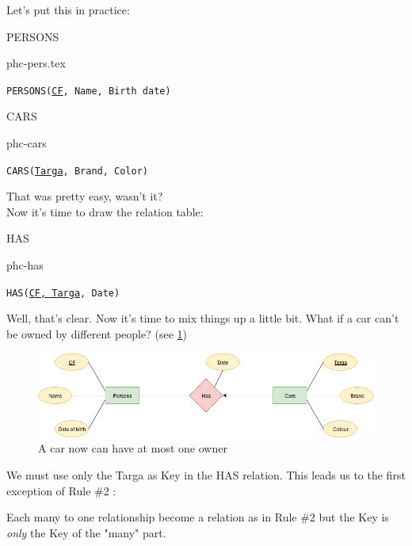 \documentclass[class=book, crop=false, oneside]{standalone}
\begin{document}
Let's put this in practice:
\vskip 20pt
\begin{minipage}{0.45\textwidth}
	PERSONS
	\begin{table}[H]
		\centering
		{phc-pers.tex}
	\end{table}
	\texttt{PERSONS(\underline{CF}, Name, Birth date)}
\end{minipage}
\hspace{.1\textwidth}
\begin{minipage}{.45\textwidth}
	CARS
	\begin{table}[H]
		\centering
		{phc-cars}
	\end{table}
	\texttt{CARS(\underline{Targa}, Brand, Color)}
\end{minipage}
\vskip 20pt
That was pretty easy, wasn't it?\\
Now it's time to draw the relation table:
\vskip 20pt
\begin{minipage}{.7\textwidth}
	HAS
	\begin{table}[H]
		{phc-has}
	\end{table}
	\texttt{HAS(\underline{CF, Targa}, Date)}
\end{minipage}
\vskip 20pt
Well, that's clear. Now it's time to mix things up a little bit.
What if a car can't be owned by different people? (see \ref{diagram1_01})
\begin{figure}[H]
	\centering
	\includegraphics[width=\textwidth,keepaspectratio]{diagram1_01.png}
	\caption{A car now can have at most one owner}
	\label{diagram1_01}
\end{figure}
We must use only the Targa as Key in the HAS relation. This leads us to the first exception of Rule \#2	:

Each many to one relationship become a relation as in Rule \#2 but the Key is \emph{only} the Key of the "many" part.
\end{document}
